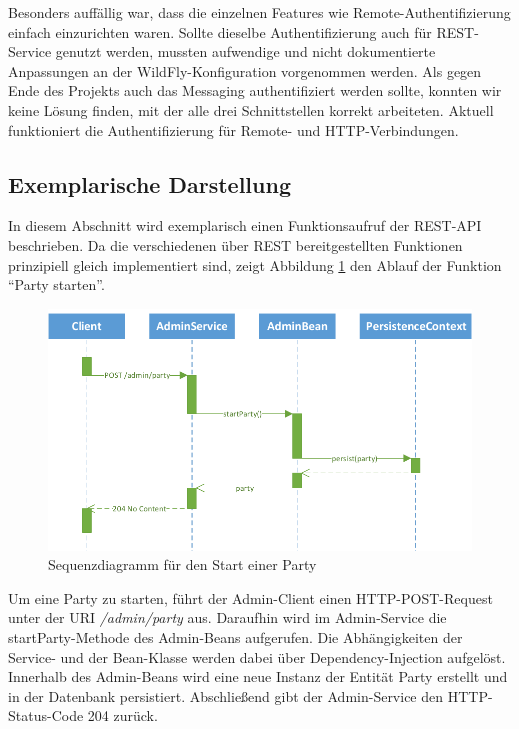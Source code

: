 Besonders auffällig war, dass die einzelnen Features wie Remote-Authentifizierung einfach einzurichten waren. Sollte dieselbe Authentifizierung auch für REST-Service genutzt werden, mussten aufwendige und nicht dokumentierte Anpassungen an der WildFly-Konfiguration vorgenommen werden. Als gegen Ende des Projekts auch das Messaging authentifiziert werden sollte, konnten wir keine Lösung finden, mit der alle drei Schnittstellen korrekt arbeiteten. Aktuell funktioniert die Authentifizierung für Remote- und HTTP-Verbindungen. 


\subsection{Exemplarische Darstellung}
In diesem Abschnitt wird exemplarisch einen Funktionsaufruf der REST-API beschrieben. Da die verschiedenen über REST bereitgestellten Funktionen prinzipiell gleich implementiert sind, zeigt Abbildung \ref{fig:AufrufSequenz} den Ablauf der Funktion "`Party starten"'.

\begin{figure}[tbh]
\centering
\includegraphics[width=1.0\linewidth]{Bilder/AufrufSequenz}
\caption{Sequenzdiagramm für den Start einer Party}
\label{fig:AufrufSequenz}
\end{figure}

Um eine Party zu starten, führt der Admin-Client einen HTTP-POST-Request unter der URI \textit{/admin/party} aus. Daraufhin wird im Admin-Service die startParty-Methode des Admin-Beans aufgerufen. Die Abhängigkeiten der Service- und der Bean-Klasse werden dabei über Dependency-Injection aufgelöst. Innerhalb des Admin-Beans wird eine neue Instanz der Entität Party erstellt und in der Datenbank persistiert. Abschließend gibt der Admin-Service den HTTP-Status-Code 204 zurück.


